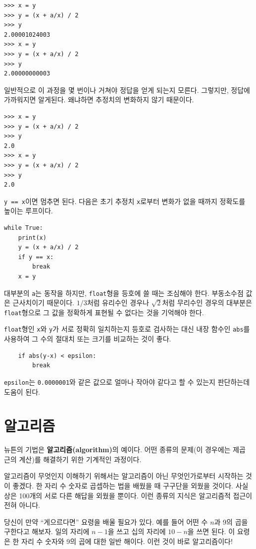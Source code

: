 \documentclass[10pt]{book}
\begin{document}
\begin{verbatim}
>>> x = y
>>> y = (x + a/x) / 2
>>> y
2.00001024003
>>> x = y
>>> y = (x + a/x) / 2
>>> y
2.00000000003
\end{verbatim}
%
일반적으로 이 과정을 몇 번이나 거쳐야 정답을 얻게 되는지 모른다.
그렇지만, 정답에 가까워지면 알게된다.  왜냐하면 추정치의 변화하지 않기
때문이다.


\begin{verbatim}
>>> x = y
>>> y = (x + a/x) / 2
>>> y
2.0
>>> x = y
>>> y = (x + a/x) / 2
>>> y
2.0
\end{verbatim}
%
{\tt y == x}이면 멈추면 된다.  다음은 초기 추정치 {\tt x}로부터 변화가
없을 때까지 정확도를 높이는 루프이다.

\begin{verbatim}
while True:
    print(x)
    y = (x + a/x) / 2
    if y == x:
        break
    x = y
\end{verbatim}
%
대부분의 {\tt a}는 동작을 하지만, {\tt float}형을 등호에 쓸 때는
조심해야 한다.  부동소수점 값은 근사치이기 때문이다.  $1/3$처럼
유리수인 경우나 $\sqrt{2}$처럼 무리수인 경우의 대부분은 {\tt
  float}형으로 그 값을 정확하게 표현될 수 없다는 것을 기억해야 한다.

{\tt float}형인 {\tt x}와 {\tt y}가 서로 정확히 일치하는지 등호로
검사하는 대신 내장 함수인 {\tt abs}를 사용하여 그 수의 절대치 또는
크기를 비교하는 것이 좋다.

\begin{verbatim}
    if abs(y-x) < epsilon:
        break
\end{verbatim}
%
\verb"epsilon"는 {\tt 0.0000001}와 같은 값으로 얼마나 작아야 같다고 할
수 있는지 판단하는데 도움이 된다.


\section{알고리즘}

뉴튼의 기법은 {\bf 알고리즘(algorithm)}의 예이다.  어떤 종류의 문제(이
경우에는 제곱 근의 계산)를 해결하기 위한 기계적인 과정이다.

알고리즘이 무엇인지 이해하기 위해서는 알고리즘이 아닌 무엇인가로부터
시작하는 것이 좋겠다.  한 자리 수 숫자로 곱셉하는 법을 배웠을 때
구구단을 외웠을 것이다.  사실상은 100개의 서로 다른 해답을 외웠을
뿐이다.  이런 종류의 지식은 알고리즘적 접근이 전혀 아니다.

당신이 만약 ``게으르다면'' 요령을 배울 필요가 있다.  예를 들어 어떤 수
$n$과 9의 곱을 구한다고 해보자.  일의 자리에 $n-1$을 쓰고 십의 자리에
$10-n$을 쓰면 된다.  이 요령은 한 자리 수 숫자와 9의 곱에 대한 일반
해이다.  이런 것이 바로 알고리즘이다!
\end{document}
